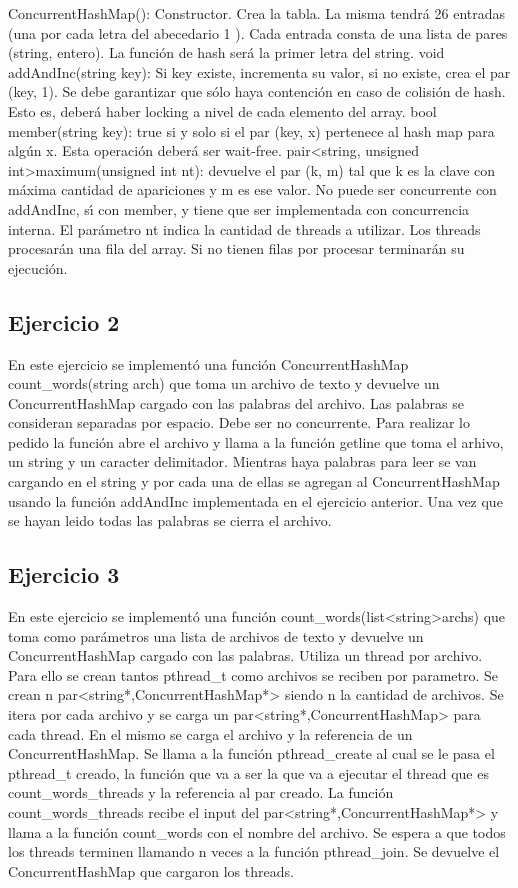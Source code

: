 \documentclass[a4paper]{article}
\begin{document}
{  ConcurrentHashMap(): Constructor. Crea la tabla. La misma tendrá 26 entradas (una por
cada letra del abecedario 1 ). Cada entrada consta de una lista de pares (string, entero). La
función de hash será la primer letra del string.
void addAndInc(string key): Si key existe, incrementa su valor, si no existe, crea el par
(key, 1). Se debe garantizar que sólo haya contención en caso de colisión de hash. Esto es,
deberá haber locking a nivel de cada elemento del array.
bool member(string key): true si y solo si el par (key, x) pertenece al hash map para algún
x. Esta operación deberá ser wait-free.
pair<string, unsigned int>maximum(unsigned int nt): devuelve el par (k, m) tal que
k es la clave con máxima cantidad de apariciones y m es ese valor. No puede ser concurrente
con addAndInc, sı́ con member, y tiene que ser implementada con concurrencia interna. El
parámetro nt indica la cantidad de threads a utilizar. Los threads procesarán una fila del
array. Si no tienen filas por procesar terminarán su ejecución.


\subsection{Ejercicio 2}

En este ejercicio se implementó una función ConcurrentHashMap count_words(string arch) que toma un archivo de texto y devuelve un ConcurrentHashMap cargado con las palabras del archivo. Las palabras se consideran separadas por espacio. Debe ser no concurrente.
Para realizar lo pedido la función abre el archivo y llama a la función getline que toma el arhivo, un string y un caracter delimitador. Mientras haya palabras para leer se van cargando en el string y por cada una de ellas se agregan al ConcurrentHashMap usando la función addAndInc implementada en el ejercicio anterior. Una vez que se hayan leido todas las palabras se cierra el archivo.


\subsection{Ejercicio 3}

En este ejercicio se implementó una función count_words(list<string>archs) que toma como parámetros una lista de archivos de texto y devuelve un ConcurrentHashMap cargado con las palabras. Utiliza un thread por archivo.
Para ello se crean tantos pthread_t como archivos se reciben por parametro. Se crean n par<string*,ConcurrentHashMap*> siendo n la cantidad de archivos. Se itera por cada archivo y se carga un par<string*,ConcurrentHashMap> para cada thread. En el mismo se carga el archivo y la referencia de un ConcurrentHashMap. Se llama a la función pthread_create al cual se le pasa el pthread_t creado, la función que va a ser la que va a ejecutar el thread que es count_words_threads y la referencia al par creado. La función count_words_threads recibe el input del par<string*,ConcurrentHashMap*> y llama a la función count_words con el nombre del archivo. Se espera a que todos los threads terminen llamando n veces a la función pthread_join. Se devuelve el ConcurrentHashMap que cargaron los threads.


}
\end{document}
